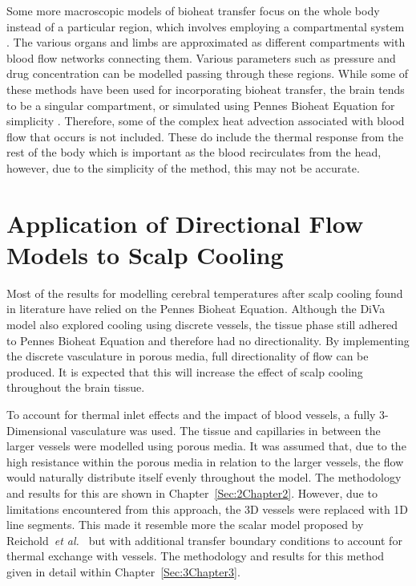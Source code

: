 \documentclass[11pt,english,a4paper,twoside,openright]{report}
\begin{document}
{{{{{{{{	Some more macroscopic models of bioheat transfer focus on the whole body instead of a particular region, which involves employing a compartmental system \cite{leaning1983modelling}. The various organs and limbs are approximated as different compartments with blood flow networks connecting them. Various parameters such as pressure and drug concentration can be modelled passing through these regions. While some of these methods have been used for incorporating bioheat transfer, the brain tends to be a singular compartment, or simulated using Pennes Bioheat Equation for simplicity \cite{konstas2007theoretical}\cite{neimark2007integration}. Therefore, some of the complex heat advection associated with blood flow that occurs is not included. These do include the thermal response from the rest of the body which is important as the blood recirculates from the head, however, due to the simplicity of the method, this may not be accurate.
	
	\section[Application of Directional Flow Models to Scalp Cooling]{{\Large A}pplication of {\Large D}irectional {\Large F}low {\Large M}odels to {\Large S}calp {\Large C}ooling}
	
	Most of the results for modelling cerebral temperatures after scalp cooling found in literature have relied on the Pennes Bioheat Equation. Although the DiVa model also explored cooling using discrete vessels, the tissue phase still adhered to Pennes Bioheat Equation and therefore had no directionality. By implementing the discrete vasculature in porous media, full directionality of flow can be produced. It is expected that this will increase the effect of scalp cooling throughout the brain tissue. 
	
	To account for thermal inlet effects and the impact of blood vessels, a fully 3-Dimensional vasculature was used. The tissue and capillaries in between the larger vessels were modelled using porous media. It was assumed that, due to the high resistance within the porous media in relation to the larger vessels, the flow would naturally distribute itself evenly throughout the model. The methodology and results for this are shown in Chapter~\ref{Sec:2Chapter2}. However, due to limitations encountered from this approach, the 3D vessels were replaced with 1D line segments. This made it resemble more the scalar model proposed by Reichold~\textit{et al.\ }\cite{reichold2009vascular} but with additional transfer boundary conditions to account for thermal exchange with vessels. The methodology and results for this method given in detail within Chapter~\ref{Sec:3Chapter3}. 
	
}}}}}}}}
\end{document}
